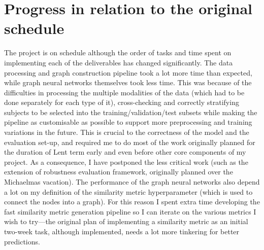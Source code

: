 \documentclass[12pt]{article}
\begin{document}
\section*{Progress in relation to the original schedule}
The project is on schedule although the order of tasks and time spent on implementing each of the deliverables has changed significantly. The data processing and graph construction pipeline took a lot more time than expected, while graph neural networks themselves took less time. This was because of the difficulties in processing the multiple modalities of the data (which had to be done separately for each type of it), cross-checking and correctly stratifying subjects to be selected into the training/validation/test subsets while making the pipeline as customisable as possible to support more preprocessing and training variations in the future. This is crucial to the correctness of the model and the evaluation set-up, and required me to do most of the work originally planned for the duration of Lent term early and even before other core components of my project. As a consequence, I have postponed the less critical work (such as the extension of robustness evaluation framework, originally planned over the Michaelmas vacation). The performance of the graph neural networks also depend a lot on my definition of the similarity metric hyperparameter (which is used to connect the nodes into a graph). For this reason I spent extra time developing the fast similarity metric generation pipeline so I can iterate on the various metrics I wish to try—the original plan of implementing a similarity metric as an initial two-week task, although implemented, needs a lot more tinkering for better predictions.
\end{document}
